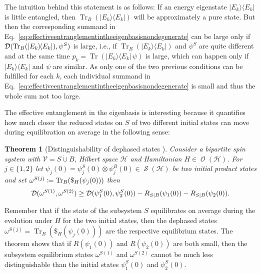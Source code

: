 \documentclass[a4paper,12pt,listof=totoc,index=totoc,bibliography=totoc,headsepline=false,headings=normal,BCOR16.153846mm,DIV12,headinclude,twoside,cleardoublepage=empty,numbers=noenddot,final]{scrreprt}
\theoremstyle{mystyle}
\numberwithin{equation}{section}
\numberwithin{figure}{section}
\numberwithin{lemma}{section}
\newtheorem{theorem}{Theorem}
\numberwithin{theorem}{section}
\numberwithin{corollary}{section}
\numberwithin{definition}{section}
\numberwithin{conjecture}{section}
\numberwithin{observation}{section}
\newcommand{\+}{\mkern2mu}
\newcommand{\coloneqq}{\mathrel{\vcentcolon\mkern-1.2mu=}} %
\newcommand{\dunion}{\mathbin{\dot{\cup}}}
\newcommand{\texteqref}[1]{Eq.~\eqref{#1}}
\renewcommand{\H}{H}
\newcommand{\Vset}{\mathcal{V}}
\newcommand{\bra}[1]{\langle #1|}
\newcommand{\ket}[1]{|#1\rangle}
\newcommand{\ketbra}[2]{\ket{#1}\!\bra{#2}}
\newcommand{\tracedistance}[3][]{
  \ifthenelse{\equal{#2}{}}
  {\ifthenelse{\equal{#3}{}}
    {\mathcal{D}_{#1}}{}
  }{
    \ifthenelse{\equal{#1}{}}
    {\operatorname{\mathcal{D}}(#2,#3)}
    {\operatorname{\mathcal{D}}_{#1}(#2,#3)}
  }
}
\DeclareMathOperator{\1}{\mathds{1}}
\DeclareMathOperator{\Obs}{\mathcal{O}}
\DeclareMathOperator{\Qst}{\mathcal{S}}
\DeclareMathOperator{\Tr}{Tr}
\newcommand{\mc}[1]{\mathcal{#1}}
\newcommand{\mcH}{\mc{H}}
\begin{document}
The intuition behind this statement is as follows:
If an energy eigenstate $\ketbra{E_k}{E_k}$ is little entangled, then $\Tr_B(\ketbra{E_k}{E_k})$ will be approximately a pure state.
But then the corresponding summand in \texteqref{eq:effectiveentranglementintheeigenbasisnondegenerate} can be large only if $\tracedistance{\Tr_B(\ketbra{E_k}{E_k})}{\psi^S}$ is large, i.e., if $\Tr_B(\ketbra{E_k}{E_k})$ and $\psi^S$ are quite different and at the same time $p_k = \Tr(\ketbra{E_k}{E_k}\,\psi)$ is large, which can happen only if $\ketbra{E_k}{E_k}$ and $\psi$ are similar.
As only one of the two previous conditions can be fulfilled for each $k$, each individual summand in \texteqref{eq:effectiveentranglementintheeigenbasisnondegenerate} is small and thus the whole sum not too large.

The effective entanglement in the eigenbasis is interesting because it quantifies how much closer the reduced states on $S$ of two different initial states can move during equilibration on average in the following sense:
\begin{theorem}[Distinguishability of dephased states {\cite[Theorem~1]{PhysRevLett.10-6}}] \label{thm:absenceofthermalizaton}
  Consider a bipartite spin system with $\Vset = S \dunion B$, Hilbert space $\mcH$ and Hamiltonian $\H \in \Obs(\mcH)$.
  For $j \in \{1,2\}$ let $\psi_j(0) = \psi^S_j(0) \otimes \psi^B_j(0) \in \Qst(\mcH)$ be two initial product states and set $\omega^{S(j)} \coloneqq \Tr_B(\$_\H(\psi_j(0)))$ then
  \begin{equation}
    \tracedistance{\omega^{S(1)}}{\omega^{S(2)}} \geq \tracedistance{\psi^S_1(0)}{\psi^S_2(0)} - R_{S|B}(\psi_1(0)) - R_{S|B}(\psi_2(0)) .
  \end{equation}
\end{theorem}
Remember that if the state of the subsystem $S$ equilibrates on average during the evolution under $\H$ for the two initial states, then the dephased states $\omega^{S(j)} = \Tr_B(\$_\H(\psi_{j}(0)))$ are the respective equilibrium states.
The theorem shows that if $R(\psi_1(0))$ and $R(\psi_2(0))$ are both small, then the subsystem equilibrium states $\omega^{S(1)}$ and $\omega^{S(2)}$ cannot be much less distinguishable than the initial states $\psi^S_1(0)$ and $\psi^S_2(0)$.
\end{document}
